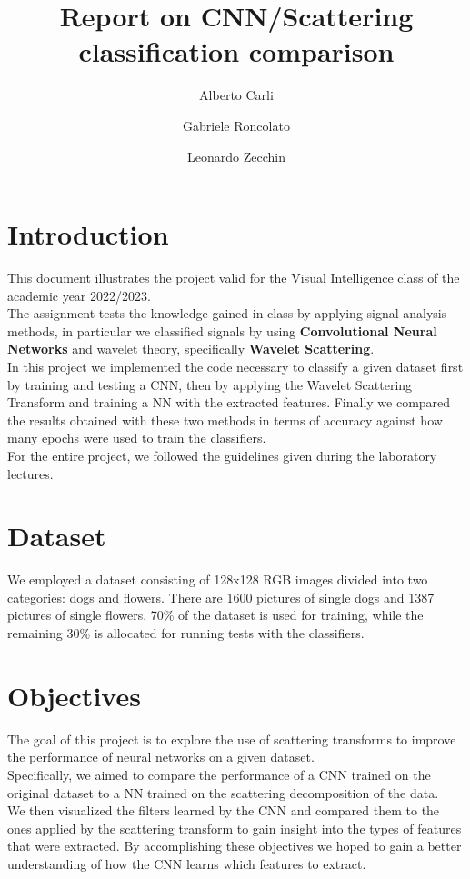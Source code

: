 \documentclass{report}
\title{Report on CNN/Scattering classification comparison}
\author{Alberto Carli \and Gabriele Roncolato \and Leonardo Zecchin }
\date{}
\begin{document}
\maketitle
\tableofcontents
\pagebreak

\chapter{Introduction}
This document illustrates the project valid for the Visual Intelligence class of the academic year 2022/2023. \\
The assignment tests the knowledge gained in class by applying signal analysis methods, in particular we classified signals by using \textbf{Convolutional Neural Networks} and wavelet theory, specifically  \textbf{Wavelet Scattering}. \\
In this project we implemented the code necessary to classify a given dataset first by training and testing a CNN, then by applying the Wavelet Scattering Transform and training a NN with the extracted features.
Finally we compared the results obtained with these two methods in terms of accuracy against how many epochs were used to train the classifiers. \\
For the entire project, we followed the guidelines given during the laboratory lectures.


\chapter{Dataset}
We employed a dataset consisting of 128x128 RGB images divided into two categories: dogs and flowers. There are 1600 pictures of single dogs and 1387 pictures of single flowers.
70\% of the dataset is used for training, while the remaining 30\% is allocated for running tests with the classifiers.

\chapter{Objectives}
The goal of this project is to explore the use of scattering transforms to improve the performance of neural networks on a given dataset.\\
Specifically, we aimed to compare the performance of a CNN trained on the original dataset to a NN trained on the scattering decomposition of the data.\\

We then visualized the filters learned by the CNN and compared them to the ones applied by the scattering transform to gain insight into the types of features that were extracted. 
By accomplishing these objectives we hoped to gain a better understanding of how the CNN learns which features to extract.
\end{document}
